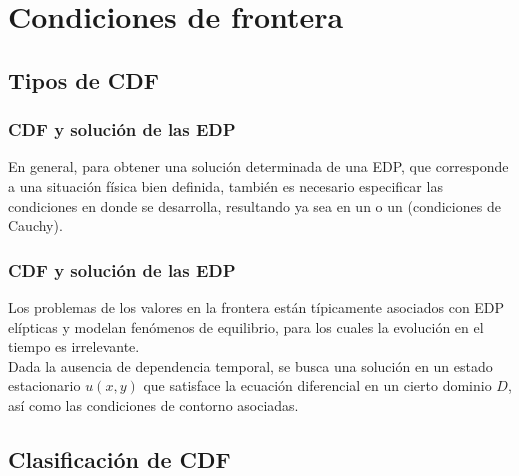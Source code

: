 \documentclass[12pt]{beamer}
\begin{document}
\section{Condiciones de frontera}
\subsection{Tipos de CDF}

\begin{frame}
\frametitle{CDF y solución de las EDP}
En general, para obtener una solución determinada de una EDP, que corresponde a una situación física bien definida, \pause también es necesario especificar las condiciones en donde se desarrolla, resultando ya sea en un  o un  (condiciones de Cauchy).
\end{frame}
\begin{frame}
\frametitle{CDF y solución de las EDP}
Los problemas de los valores en la frontera están típicamente asociados con EDP elípticas y modelan fenómenos de equilibrio, para los cuales la evolución en el tiempo es irrelevante.
\\
\bigskip
\pause
Dada la ausencia de dependencia temporal, se busca una solución en un estado estacionario $u (x, y)$ que satisface la ecuación diferencial en un cierto dominio $D$, así como las condiciones de contorno asociadas. 
\end{frame}

\subsection{Clasificación de CDF}
\end{document}
